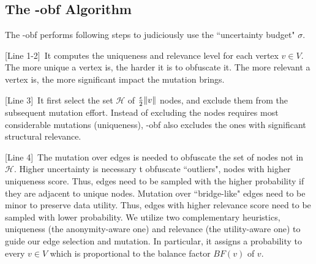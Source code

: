 \subsection{The {\methodName}-obf Algorithm}

The {\methodName}-obf performs following steps to judiciously use the ``uncertainty budget" $\sigma$.

[Line 1-2]~It computes the uniqueness and relevance level for each vertex $v \in V$. 
The more unique a vertex is, the harder it is to obfuscate it. 
The more relevant a vertex is, the more significant impact the mutation brings.

[Line 3]~It first select the set $\mathcal{H}$ of $\frac{\epsilon}{2}\|v\|$ nodes, and exclude them from the subsequent mutation effort. Instead of excluding the nodes requires most considerable mutations (uniqueness), {\methodName}-obf also excludes the ones with significant structural relevance. 

[Line 4]~The mutation over edges is needed to obfuscate the set of nodes not in $\mathcal{H}$. 
Higher uncertainty is necessary t obfuscate  ``outliers", nodes with higher uniqueness score. 
Thus, edges need to be sampled with the higher probability if they are adjacent to unique nodes. 
Mutation over ``bridge-like" edges need to be minor to preserve data utility. 
Thus, edges with higher relevance score need to be sampled with lower probability.
We utilize two complementary heuristics, uniqueness (the anonymity-aware one) and relevance (the utility-aware one) to guide our edge selection and mutation. 
In particular, it assigns a probability to every $v \in V$ which is proportional to the balance factor $BF(v)$ of $v$. 
